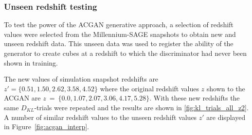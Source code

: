 \documentclass[twocolumn]{article}
\numberwithin{equation}{section}
\begin{document}






\subsubsection{Unseen redshift testing}
To test the power of the ACGAN generative approach, a selection of redshift values were selected from the Millennium-SAGE
snapshots to obtain new and unseen redshift data. This unseen data was used to register the ability of the generator to
create cubes at a redshift to which the discriminator had never been shown in training. 

The new values of simulation snapshot redshifts are $z'=\{0.51, 1.50, 2.62, 3.58, 4.52\}$ where the original redshift values
$z$ shown to the ACGAN are $z~=~\{0.0, 1.07, 2.07, 3.06, 4.17, 5.28\}$. With these new redshifts the same $D_{KL}$-trials 
were repeated and the results are shown in \ref{fig:kl_trials_all_z2}. A number of similar redshift values to the unseen
redshift values $z'$ are displayed in Figure~\ref{fig:acgan_interp}.
\end{document}
